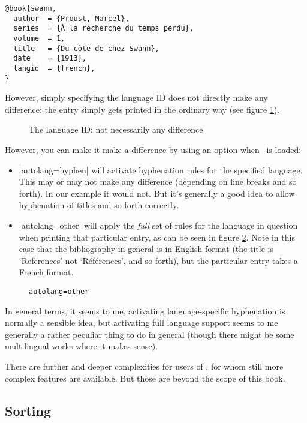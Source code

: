 \begin{verbatim}
@book{swann,
  author  = {Proust, Marcel},
  series  = {À la recherche du temps perdu},
  volume  = 1,
  title   = {Du côté de chez Swann},
  date    = {1913},
  langid  = {french},
}
\end{verbatim}

However, simply specifying the language ID does not directly make any difference: the entry simply gets printed in the ordinary way (see figure \ref{proust1}).
\begin{figure}
\caption{The language ID: not necessarily any difference\label{proust1}}
\end{figure}

However, you can make it make a difference by using an option when \biblatex\ is loaded:
\begin{itemize}
\item |autolang=hyphen| will activate hyphenation rules for the specified language. This may or may not make any difference (depending on line breaks and so forth). In our example it would not. But it's generally a good idea to allow hyphenation of titles and so forth correctly.
\item |autolang=other| will apply the \emph{full} set of rules for the language in question when printing that particular entry, as can be seen in figure \ref{proust2}. Note in this case that the bibliography in general is in English format (the title is `References' not `Références', and so forth), but the particular entry takes a French format.
\end{itemize}

\begin{figure}
\caption{\texttt{autolang=other}\label{proust2}}
\end{figure}

In general terms, it seems to me, activating language-specific hyphenation is normally a sensible idea, but activating full language support seems to me generally a rather peculiar thing to do in general (though there might be some multilingual works where it makes sense).

There are further and deeper complexities for users of , for whom still more complex features are available. But those are beyond the scope of this book.

\subsection{Sorting}


